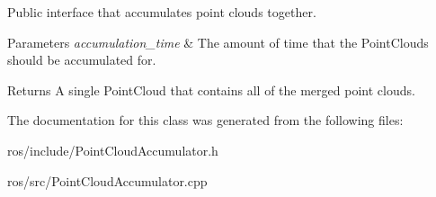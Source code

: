 \-Public interface that accumulates point clouds together. 


\begin{DoxyParams}{\-Parameters}
{\em accumulation\-\_\-time} & \-The amount of time that the \-Point\-Clouds should be accumulated for.\\
\hline
\end{DoxyParams}
\begin{DoxyReturn}{\-Returns}
\-A single \-Point\-Cloud that contains all of the merged point clouds. 
\end{DoxyReturn}


\-The documentation for this class was generated from the following files\-:\begin{DoxyCompactItemize}
\item 
ros/include/\-Point\-Cloud\-Accumulator.\-h\item 
ros/src/\-Point\-Cloud\-Accumulator.\-cpp\end{DoxyCompactItemize}
